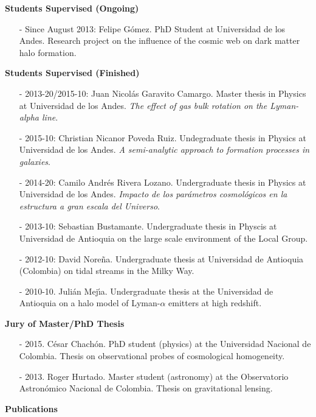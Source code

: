 \documentclass[letterpaper,11pt,onecolumn]{article}
\begin{document}
{\bf Students Supervised (Ongoing)}
\begin{itemize}
\item[-] Since August 2013: Felipe G\'omez. PhD Student at
  Universidad de los Andes. Research project on the
  influence of the cosmic web on dark matter halo formation. 
\end{itemize}

{\bf Students Supervised (Finished)}
\begin{itemize}

\item[-] 2013-20/2015-10: Juan Nicol\'as Garavito Camargo. Master
  thesis in Physics at Universidad de los Andes. \emph{The effect of
    gas bulk rotation on the Lyman-alpha line}.
\item[-] 2015-10: Christian Nicanor Poveda Ruiz. Undegraduate thesis
  in Physics at Universidad de los Andes. \emph{A semi-analytic
    approach to formation processes in galaxies}. 
\item[-] 2014-20: Camilo Andr\'es Rivera Lozano. Undergraduate thesis
  in Physics at Universidad de los Andes. \emph{Impacto de los
    par\'ametros cosmol\'ogicos en la 
    estructura a gran escala del Universo}.
\item[-] 2013-10: Sebastian Bustamante. Undergraduate thesis in
  Physcis at Universidad de Antioquia on the large scale environment
  of the Local Group.  
\item[-] 2012-10: David Nore\~na. Undergraduate thesis at Universidad
  de Antioquia (Colombia) on tidal streams in the Milky Way. 
\item[-] 2010-10. Juli\'an Mej\'{\i}a. Undergraduate thesis at the
  Universidad de Antioquia on a halo model of
  Lyman-$\alpha$ emitters at high redshift. 
\end{itemize}





{\bf Jury of Master/PhD Thesis}
\begin{itemize}
\item[-] 2015. C\'esar Chach\'on. PhD student (physics) at the Universidad Nacional de Colombia. Thesis on observational probes of cosmological homogeneity.
\item[-] 2013. Roger Hurtado. Master student (astronomy) at the Observatorio Astron\'omico Nacional de Colombia. Thesis on gravitational lensing.
\end{itemize}

{\bf Publications}\\
\end{document}
